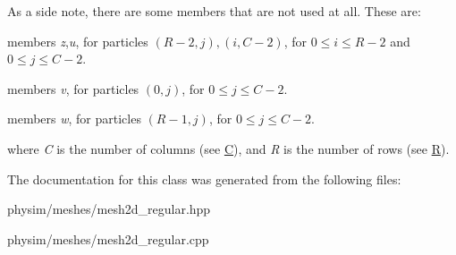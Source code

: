 As a side note, there are some members that are not used at all. These are\+:
\begin{DoxyItemize}
\item members {\itshape z},{\itshape u}, for particles $(R-2,j), (i,C-2)$, for $0 \le i \le R - 2$ and $0 \le j \le C - 2$.
\item members {\itshape v}, for particles $(0,j)$, for $0 \le j \le C - 2$.
\item members {\itshape w}, for particles $(R-1,j)$, for $0 \le j \le C - 2$.
\end{DoxyItemize}

where {\itshape C} is the number of columns (see \hyperlink{classphysim_1_1meshes_1_1mesh2d__regular_ae26a7e636588726103a835faf67b7771}{C}), and {\itshape R} is the number of rows (see \hyperlink{classphysim_1_1meshes_1_1mesh2d__regular_a5940b5ab5b5b67139d13c10e473b4894}{R}). 

The documentation for this class was generated from the following files\+:\begin{DoxyCompactItemize}
\item 
physim/meshes/mesh2d\+\_\+regular.\+hpp\item 
physim/meshes/mesh2d\+\_\+regular.\+cpp\end{DoxyCompactItemize}
